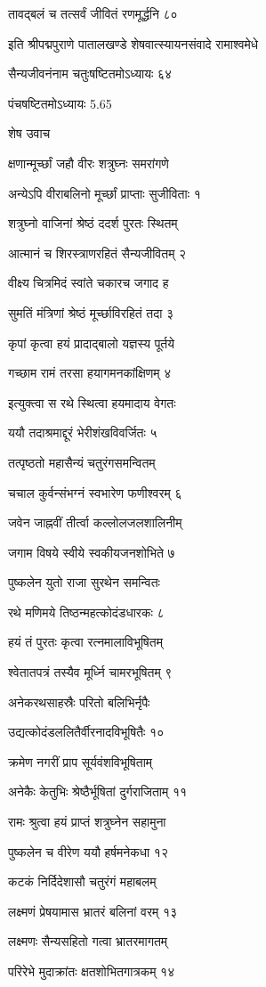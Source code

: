 तावद्बलं च तत्सर्वं जीवितं रणमूर्द्धनि ८०

इति श्रीपद्मपुराणे पातालखण्डे शेषवात्स्यायनसंवादे रामाश्वमेधे

सैन्यजीवनंनाम चतुःषष्टितमोऽध्यायः ६४

पंचषष्टितमोऽध्यायः 5.65

शेष उवाच

क्षणान्मूर्च्छां जहौ वीरः शत्रुघ्नः समरांगणे

अन्येऽपि वीराबलिनो मूर्च्छां प्राप्ताः सुजीविताः १

शत्रुघ्नो वाजिनां श्रेष्ठं ददर्श पुरतः स्थितम्

आत्मानं च शिरस्त्राणरहितं सैन्यजीवितम् २

वीक्ष्य चित्रमिदं स्वांते चकारच जगाद ह

सुमतिं मंत्रिणां श्रेष्ठं मूर्च्छाविरहितं तदा ३

कृपां कृत्वा हयं प्रादाद्बालो यज्ञस्य पूर्तये

गच्छाम रामं तरसा हयागमनकांक्षिणम् ४

इत्युक्त्वा स रथे स्थित्वा हयमादाय वेगतः

ययौ तदाश्रमाद्दूरं भेरीशंखविवर्जितः ५

तत्पृष्ठतो महासैन्यं चतुरंगसमन्वितम्

चचाल कुर्वन्संभग्नं स्वभारेण फणीश्वरम् ६

जवेन जाह्नवीं तीर्त्वा कल्लोलजलशालिनीम्

जगाम विषये स्वीये स्वकीयजनशोभिते ७

पुष्कलेन युतो राजा सुरथेन समन्वितः

रथे मणिमये तिष्ठन्महत्कोदंडधारकः ८

हयं तं पुरतः कृत्वा रत्नमालाविभूषितम्

श्वेतातपत्रं तस्यैव मूर्ध्नि चामरभूषितम् ९

अनेकरथसाहस्रैः परितो बलिभिर्नृपैः

उद्यत्कोदंडललितैर्वीरनादविभूषितैः १०

क्रमेण नगरीं प्राप सूर्यवंशविभूषिताम्

अनेकैः केतुभिः श्रेष्ठैर्भूषितां दुर्गराजिताम् ११

रामः श्रुत्वा हयं प्राप्तं शत्रुघ्नेन सहामुना

पुष्कलेन च वीरेण ययौ हर्षमनेकधा १२

कटकं निर्दिदेशासौ चतुरंगं महाबलम्

लक्ष्मणं प्रेषयामास भ्रातरं बलिनां वरम् १३

लक्ष्मणः सैन्यसहितो गत्वा भ्रातरमागतम्

परिरेभे मुदाक्रांतः क्षतशोभितगात्रकम् १४

